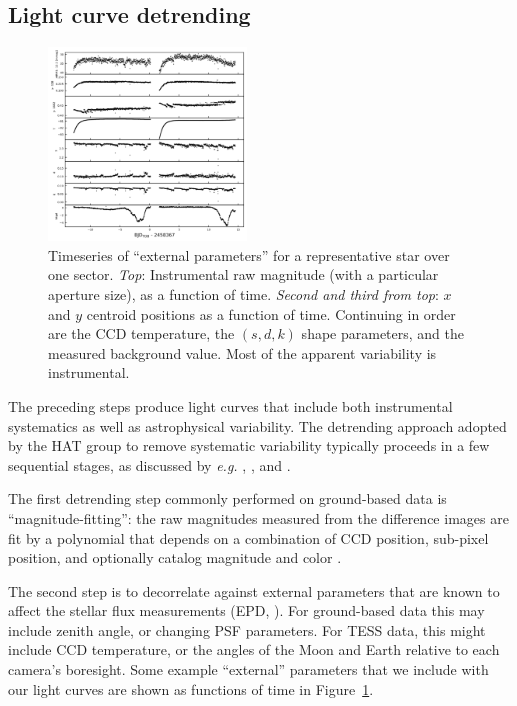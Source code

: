 \documentclass[12pt,twocolumn,tighten]{aastex62}
\begin{document}
\subsection{Light curve detrending}
\label{subsec:lcdetrending}

\begin{figure}[!t]
	\begin{center}
		\leavevmode
		\includegraphics[width=0.47\textwidth]{epdparams_vs_time.png}
	\end{center}
	\vspace{-0.5cm}
	\caption{
		Timeseries of ``external parameters'' for a representative
			star over one sector.
			{\it Top}: Instrumental raw magnitude (with a particular
		aperture size), as a function of time.  {\it Second and third from
			top}: $x$ and $y$ centroid positions as a function of time.
		Continuing in order are the CCD temperature, the $(s,d,k)$ shape
		parameters, and the measured background value.
		Most of the apparent variability is instrumental.
		\label{fig:external_parameter_timeseries}
	}
\end{figure}

The preceding steps produce light curves that include both
instrumental systematics as well as astrophysical variability.  The
detrending approach adopted by the HAT group to remove systematic
variability typically proceeds in a few sequential stages, as
discussed by {\it e.g.} \citet{bakos_2010}, \citet{huang_high-precision_2015},
and \citet{zhang_precision_2016}.

The first detrending step commonly performed on ground-based data is
``magnitude-fitting'': the raw magnitudes measured from the difference
images are fit by a polynomial that depends on a combination of CCD
position, sub-pixel position, and optionally catalog magnitude and
color \citep[][\S~5.5]{zhang_precision_2016}.

The second step is to decorrelate against external parameters that are
known to affect the stellar flux measurements (EPD,
\citealt[][]{bakos_2010}).  For ground-based data this may
include zenith angle, or changing PSF parameters.  For TESS data, this
might include CCD temperature, or the angles of the Moon and Earth
relative to each camera's boresight.
Some example ``external'' parameters that we
include with our light curves are shown as functions of time in
Figure~\ref{fig:external_parameter_timeseries}.
\end{document}
